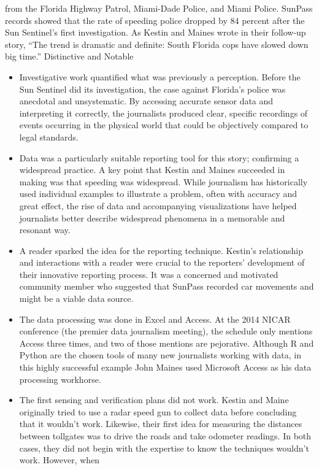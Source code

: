 from the Florida Highway Patrol, Miami-Dade Police, and Miami Police.
SunPass records showed that the rate of speeding police dropped by 84 percent
after the Sun Sentinel's first investigation. As Kestin and Maines wrote
in their follow-up story, ``The trend is dramatic and definite: South Florida
cops have slowed down big time.''
Distinctive and Notable
\begin{itemize}
\item Investigative work quantified what was previously a perception.
Before the Sun Sentinel did its investigation, the case against Florida's
police was anecdotal and unsystematic. By accessing accurate sensor
data and interpreting it correctly, the journalists produced clear, specific
recordings of events occurring in the physical world that could
be objectively compared to legal standards.
\item Data was a particularly suitable reporting tool for this story;
confirming a widespread practice.
A key point that Kestin and Maines succeeded in making was that
speeding was widespread. While journalism has historically used
individual examples to illustrate a problem, often with accuracy and
great effect, the rise of data and accompanying visualizations have
helped journalists better describe widespread phenomena in a memorable
and resonant way.
\item A reader sparked the idea for the reporting technique.
Kestin's relationship and interactions with a reader were crucial to the
reporters' development of their innovative reporting process. It was
a concerned and motivated community member who suggested that
SunPass recorded car movements and might be a viable data source.
\item The data processing was done in Excel and Access.
At the 2014 NICAR conference (the premier data journalism meeting),
the schedule only mentions Access three times, and two of
those mentions are pejorative. Although R and Python are the chosen
tools of many new journalists working with data, in this highly
successful example John Maines used Microsoft Access as his data
processing workhorse.
\item The first sensing and verification plans did not work.
Kestin and Maine originally tried to use a radar speed gun to collect
data before concluding that it wouldn't work. Likewise, their first idea
for measuring the distances between tollgates was to drive the roads
and take odometer readings. In both cases, they did not begin with
the expertise to know the techniques wouldn't work. However, when

\end{itemize}
